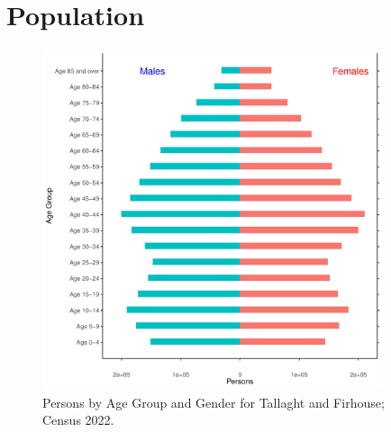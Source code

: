 \documentclass{article}
\begin{document}
\pagebreak

\section{Population} 
\label{sect:Pop}

\begin{figure}[h]
	\centering
	\includegraphics[width = 100mm]{../figures/PyramidPlot.pdf}
	\caption{Persons by Age Group and Gender for Tallaght and Firhouse; Census 2022.}
	\label{fig:2ae19629-1a6a-13a3-e055-000000000001}
	\end{figure}
\end{document}

